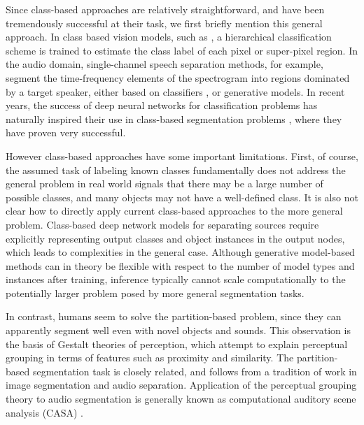 \documentclass[9pt]{article} \usepackage{nips15submit_e,times}
\begin{document}
Since class-based approaches are relatively straightforward, and have been tremendously successful at their task, we first briefly mention this general approach.   In class based vision models, such as \cite{farabet2013learning,sharma2014recursive,smaragdis2007convolutive}, a hierarchical classification scheme is trained to estimate the class label of each pixel or super-pixel region.  In the audio domain, single-channel speech separation methods, for example, segment the time-frequency elements of the spectrogram into regions dominated by a target speaker, either based on classifiers \cite{weiss2006estimating,kim2009algorithm,wang2013exploring}, or generative models\cite{Roweis03,schmidt2006single, hershey2010super}.   In recent years, the success of deep neural networks for classification problems has naturally inspired their use in class-based segmentation problems \cite{sharma2014recursive,wang2013towards}, where they have proven very successful.  

However class-based approaches have some important limitations.  First, of course, the assumed task of labeling known classes fundamentally does not address the general problem in real world signals that there may be a large number of possible classes, and many objects may not have a well-defined class.   It is also not clear how to directly apply current class-based approaches to the more general problem.   Class-based deep network models for separating sources require explicitly representing output classes and object instances in the output nodes, which leads to complexities in the general case.  Although generative model-based methods can in theory be flexible with respect to the number of model types and instances after training, inference typically cannot scale computationally to the potentially larger problem posed by more general segmentation tasks.     


In contrast,  humans seem to solve the partition-based problem, since they can apparently segment well even with novel objects and sounds.  This observation is the basis of Gestalt theories of perception, which attempt to explain perceptual grouping in terms of features such as proximity and similarity\cite{wertheimer1938laws}.  The partition-based segmentation task is closely related, and follows from a tradition of work in image segmentation and audio separation.  Application of the perceptual grouping theory to audio segmentation is generally known as computational auditory scene analysis (CASA) \cite{Cooke91,Ellis96}.    
\end{document}
